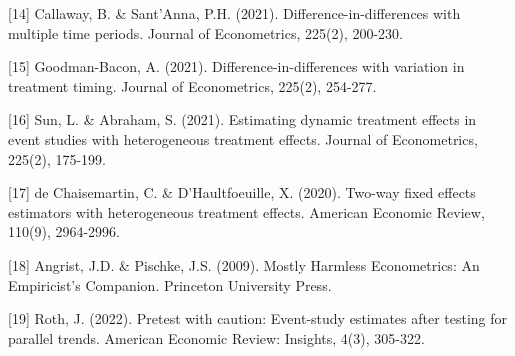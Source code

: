 \documentclass[11pt,a4paper]{article}
\begin{document}
[14] Callaway, B. \& Sant'Anna, P.H. (2021). Difference-in-differences with multiple time periods. Journal of Econometrics, 225(2), 200-230.

[15] Goodman-Bacon, A. (2021). Difference-in-differences with variation in treatment timing. Journal of Econometrics, 225(2), 254-277.

[16] Sun, L. \& Abraham, S. (2021). Estimating dynamic treatment effects in event studies with heterogeneous treatment effects. Journal of Econometrics, 225(2), 175-199.

[17] de Chaisemartin, C. \& D'Haultfoeuille, X. (2020). Two-way fixed effects estimators with heterogeneous treatment effects. American Economic Review, 110(9), 2964-2996.

[18] Angrist, J.D. \& Pischke, J.S. (2009). Mostly Harmless Econometrics: An Empiricist's Companion. Princeton University Press.

[19] Roth, J. (2022). Pretest with caution: Event-study estimates after testing for parallel trends. American Economic Review: Insights, 4(3), 305-322.
\end{document}
